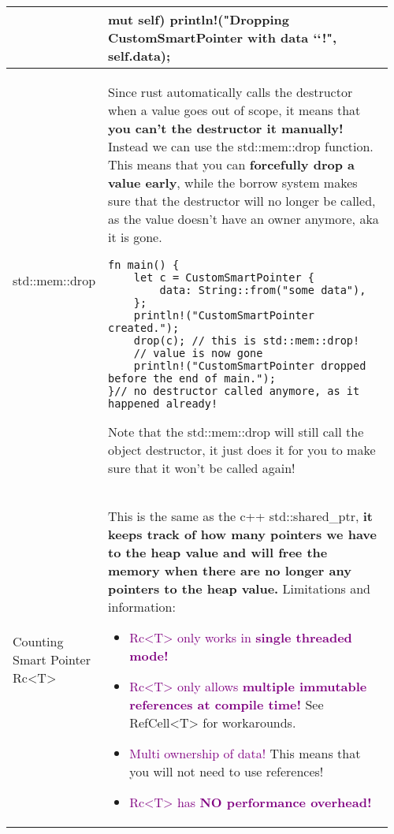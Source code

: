\documentclass[main.tex,fontsize=8pt,paper=a4,paper=portrait,DIV=calc,]{scrartcl}
\begin{document}
\begin{table}[ht!]
\begin{tabular}{|m{0.2\linewidth}|m{0.755\linewidth}|}
\begin{lstlisting}
impl Drop for CustomSmartPointer {
    fn drop(&mut self) {
        println!("Dropping CustomSmartPointer with data `{}`!", self.data);
    }
}

fn main() {
    let c = CustomSmartPointer {
        data: String::from("my stuff"),
    };
    let d = CustomSmartPointer {
        data: String::from("other stuff"),
    };
    println!("CustomSmartPointers created.");
}
\end{lstlisting}\\
\hline
std::mem::drop & 
Since rust automatically calls the destructor when a value goes out of scope, it means that \textbf{you can't the destructor it manually!}\newline
\textcolor{OliveGreen}{Instead we can use the std::mem::drop function.}\newline
This means that you can \textbf{forcefully drop a value early}, while the borrow system makes sure that the destructor will no longer be called, as the value doesn't have an owner anymore, aka it is gone.\newline
\begin{lstlisting}
fn main() {
    let c = CustomSmartPointer {
        data: String::from("some data"),
    };
    println!("CustomSmartPointer created.");
    drop(c); // this is std::mem::drop!
    // value is now gone
    println!("CustomSmartPointer dropped before the end of main.");
}// no destructor called anymore, as it happened already!
\end{lstlisting}
\textcolor{OliveGreen}{Note that the std::mem::drop will still call the object destructor, it just does it for you to make sure that it won't be called again!}\\
\hline
Counting Smart Pointer Rc<T> & 
This is the same as the c++ std::shared\_ptr, \textbf{it keeps track of how many pointers we have to the heap value and will free the memory when there are no longer any pointers to the heap value.}\newline
Limitations and information:\newline
\begin{itemize}
\item \textcolor{purple}{Rc<T> only works in \textbf{single threaded mode!}}
\item \textcolor{purple}{Rc<T> only allows \textbf{multiple immutable references at compile time!}}\newline
  See RefCell<T> for workarounds.
\item \textcolor{purple}{Multi ownership of data!}\newline
  This means that you will not need to use references!
\item \textcolor{purple}{Rc<T> has \textbf{NO performance overhead!}}
\vspace{-3mm}
\end{itemize} 
\\
\hline
\end{tabular}
\end{table}
\end{document}
